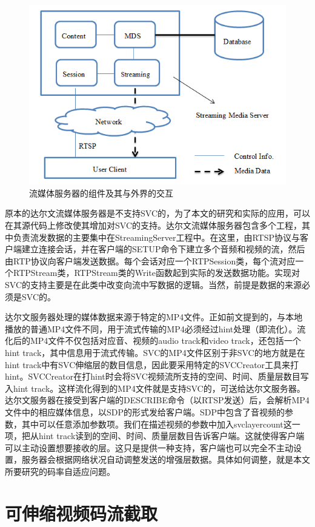 \begin{figure}[h]
	\centering
	\includegraphics[width = 0.9\linewidth]{clip/11.png}
	\caption{流媒体服务器的组件及其与外界的交互\label{fig:11}}
\end{figure}

原本的达尔文流媒体服务器是不支持SVC的，为了本文的研究和实际的应用，可以在其源代码上修改使其增加对SVC的支持。达尔文流媒体服务器包含多个工程，其中负责流发数据的主要集中在StreamingServer工程中。在这里，由RTSP协议与客户端建立连接会话，并在客户端的SETUP命令下建立多个音频和视频的流，然后由RTP协议向客户端发送数据。每个会话对应一个RTPSession类，每个流对应一个RTPStream类，RTPStream类的Write函数起到实际的发送数据功能。实现对SVC的支持主要是在此类中改变向流中写数据的逻辑。当然，前提是数据的来源必须是SVC的。

达尔文服务器处理的媒体数据来源于特定的MP4文件。正如前文提到的，与本地播放的普通MP4文件不同，用于流式传输的MP4必须经过hint处理（即流化）。流化后的MP4文件不仅包括对应音、视频的audio track和video track，还包括一个hint track，其中信息用于流式传输。SVC的MP4文件区别于非SVC的地方就是在hint track中有SVC伸缩层的数目信息，因此要采用特定的SVCCreator工具来打hint。SVCCreator在打hint时会将SVC视频流所支持的空间、时间、质量层数目写入hint track。这样流化得到的MP4文件就是支持SVC的，可送给达尔文服务器。达尔文服务器在接受到客户端的DESCRIBE命令（以RTSP发送）后，会解析MP4文件中的相应媒体信息，以SDP的形式发给客户端。SDP中包含了音视频的参数，其中可以任意添加参数项。我们在描述视频的参数中加入svclayercount这一项，把从hint track读到的空间、时间、质量层数目告诉客户端。这就使得客户端可以主动设置想要接收的层。这只是提供一种支持，客户端也可以完全不主动设置，服务器会根据网络状况自动调整发送的增强层数据。具体如何调整，就是本文所要研究的码率自适应问题。

\section{可伸缩视频码流截取}

